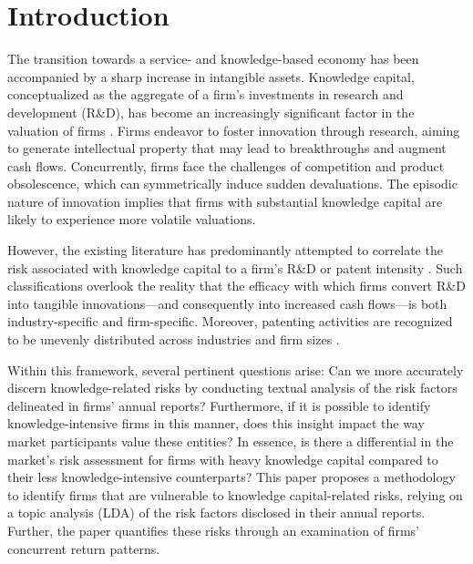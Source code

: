 \documentclass[12pt, letterpaper]{article}
\begin{document}
\onehalfspacing 

\section{Introduction}








The transition towards a service- and knowledge-based economy has been accompanied by a sharp increase in intangible assets. Knowledge capital, conceptualized as the aggregate of a firm's investments in research and development (R\&D), has become an increasingly significant factor in the valuation of firms \citep{Belo2019-iz}. Firms endeavor to foster innovation through research, aiming to generate intellectual property that may lead to breakthroughs and augment cash flows. Concurrently, firms face the challenges of competition and product obsolescence, which can symmetrically induce sudden devaluations. The episodic nature of innovation implies that firms with substantial knowledge capital are likely to experience more volatile valuations. 

However, the existing literature has predominantly attempted to correlate the risk associated with knowledge capital to a firm's R\&D or patent intensity \citep{Andrei2019-bh}. Such classifications overlook the reality that the efficacy with which firms convert R\&D into tangible innovations—and consequently into increased cash flows—is both industry-specific and firm-specific. Moreover, patenting activities are recognized to be unevenly distributed across industries and firm sizes \citep{mezzanotti2023innovation, Li2020-xc}. 

Within this framework, several pertinent questions arise: Can we more accurately discern knowledge-related risks by conducting textual analysis of the risk factors delineated in firms' annual reports? Furthermore, if it is possible to identify knowledge-intensive firms in this manner, does this insight impact the way market participants value these entities? In essence, is there a differential in the market's risk assessment for firms with heavy knowledge capital compared to their less knowledge-intensive counterparts? This paper proposes a methodology to identify firms that are vulnerable to knowledge capital-related risks, relying on a topic analysis (LDA) of the risk factors disclosed in their annual reports. Further, the paper quantifies these risks through an examination of firms' concurrent return patterns.
\end{document}
